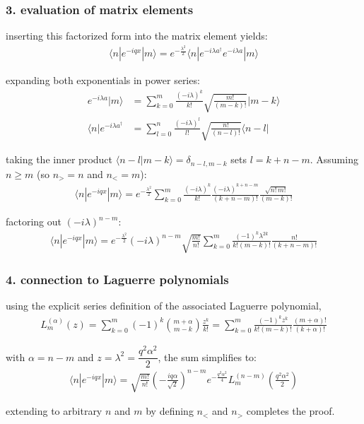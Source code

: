 \subsubsection{3. evaluation of matrix elements}
inserting this factorized form into the matrix element yields:
\begin{align}
  \langle n | e^{-iqx} | m \rangle = e^{-\frac{\lambda^2}{2}} \langle n | e^{-i \lambda a^\dagger} e^{-i \lambda a} | m \rangle
\end{align}

expanding both exponentials in power series:
\begin{align}
  e^{-i \lambda a} |m\rangle          & = \sum_{k=0}^{m} \frac{(-i\lambda)^k}{k!} \sqrt{\frac{m!}{(m-k)!}} |m-k\rangle  \\
  \langle n| e^{-i \lambda a^\dagger} & = \sum_{l=0}^{n} \frac{(-i\lambda)^l}{l!} \sqrt{\frac{n!}{(n-l)!}} \langle n-l|
\end{align}

taking the inner product $\langle n-l | m-k \rangle = \delta_{n-l, m-k}$ sets $l = k + n - m$. Assuming $n \ge m$ (so $n_> = n$ and $n_< = m$):
\begin{align}
  \langle n | e^{-iqx} | m \rangle = e^{-\frac{\lambda^2}{2}} \sum_{k=0}^{m} \frac{(-i\lambda)^k}{k!} \frac{(-i\lambda)^{k + n - m}}{(k + n - m)!} \frac{\sqrt{n!\, m!}}{(m - k)!}
\end{align}

factoring out $(-i\lambda)^{n-m}$:
\begin{align}
  \langle n | e^{-iqx} | m \rangle = e^{-\frac{\lambda^2}{2}} (-i\lambda)^{n-m} \sqrt{\frac{m!}{n!}} \sum_{k=0}^{m} \frac{(-1)^k \lambda^{2k}}{k! (m-k)!} \frac{n!}{(k + n - m)!}
\end{align}

\subsubsection{4. connection to Laguerre polynomials}
using the explicit series definition of the associated Laguerre polynomial,
\begin{align}
  L_m^{(\alpha)}(z) = \sum_{k=0}^{m} (-1)^k \binom{m+\alpha}{m-k} \frac{z^k}{k!} = \sum_{k=0}^{m} \frac{(-1)^k z^k}{k! (m-k)!} \frac{(m+\alpha)!}{(k+\alpha)!}
\end{align}

with $\alpha = n - m$ and $z = \lambda^2 = \dfrac{q^2 \alpha ^2}{2}$, the sum simplifies to:
\begin{align}
  \langle n | e^{-iqx} | m \rangle = \sqrt{\frac{m!}{n!}} \left(-\frac{i q \alpha }{\sqrt{2}}\right)^{n-m} e^{-\frac{q^2 \alpha ^2}{4}} L_m^{(n-m)}\!\left(\frac{q^2 \alpha ^2}{2}\right)
\end{align}

extending to arbitrary $n$ and $m$ by defining $n_<$ and $n_>$ completes the proof.
